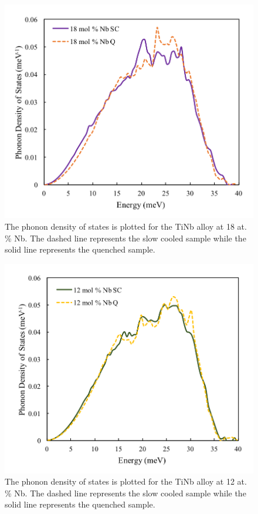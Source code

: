 \pagebreak
\begin{figure}[H]
	\centering
	\includegraphics[width=\textwidth]{Chapter-7/Figures/50dos_18.png}
	\caption{The phonon density of states is plotted for the TiNb alloy at 18 at. \% Nb. The dashed line represents the slow cooled sample while the solid line represents the quenched sample.}
	\label{Ch7-figure:50dos_18}
\end{figure}

\pagebreak
\begin{figure}[H]
	\centering
	\includegraphics[width=\textwidth]{Chapter-7/Figures/50dos_12.png}
	\caption{The phonon density of states is plotted for the TiNb alloy at 12 at. \% Nb. The dashed line represents the slow cooled sample while the solid line represents the quenched sample.}
	\label{Ch7-figure:50dos_12}
\end{figure}

